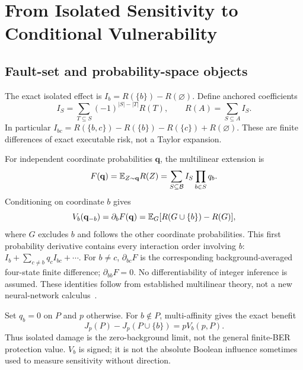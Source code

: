 \section{From Isolated Sensitivity to Conditional Vulnerability}\label{sec:susceptibility}
\subsection{Fault-set and probability-space objects}
The exact isolated effect is $I_b=R(\{b\})-R(\varnothing)$. Define anchored coefficients
\begin{equation}\label{eq:mobius}
I_S=\sum_{T\subseteq S}(-1)^{|S|-|T|}R(T),\qquad R(A)=\sum_{S\subseteq A}I_S.
\end{equation}
In particular $I_{bc}=R(\{b,c\})-R(\{b\})-R(\{c\})+R(\varnothing)$. These are finite differences of exact executable risk, not a Taylor expansion.

For independent coordinate probabilities $\mathbf q$, the multilinear extension is
\begin{equation}\label{eq:multi-extension}
F(\mathbf q)=\mathbb{E}_{Z\sim\mathbf q}R(Z)=\sum_{S\subseteq\mathcal B}I_S\prod_{b\in S}q_b.
\end{equation}
Conditioning on coordinate $b$ gives
\begin{equation}\label{eq:prob-gradient}
V_b(\mathbf q_{-b})=\partial_b F(\mathbf q)=\mathbb{E}_G[R(G\cup\{b\})-R(G)],
\end{equation}
where $G$ excludes $b$ and follows the other coordinate probabilities. This first probability derivative contains every interaction order involving $b$: $I_b+\sum_{c\ne b}q_cI_{bc}+\cdots$. For $b\ne c$, $\partial_{bc}F$ is the corresponding background-averaged four-state finite difference; $\partial_{bb}F=0$. No differentiability of integer inference is assumed. These identities follow from established multilinear theory, not a new neural-network calculus~\cite{odonnell2014analysis,rauzy2022reliability}.

Set $q_b=0$ on $P$ and $p$ otherwise. For $b\notin P$, multi-affinity gives the exact benefit
\begin{equation}\label{eq:protection-benefit}
J_p(P)-J_p(P\cup\{b\})=p V_b(p,P).
\end{equation}
Thus isolated damage is the zero-background limit, not the general finite-BER protection value. $V_b$ is signed; it is not the absolute Boolean influence sometimes used to measure sensitivity without direction.

